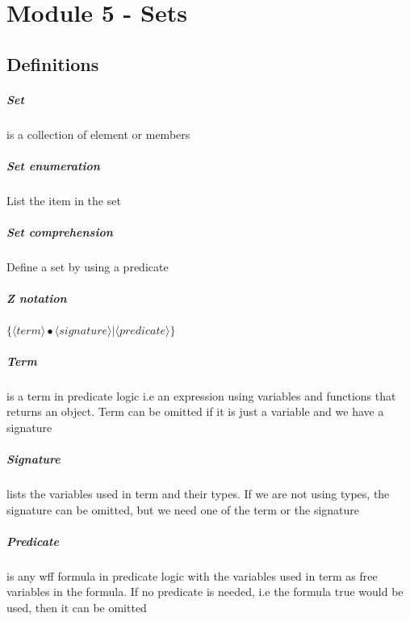\chapter{Module 5 - Sets}
  \section{Definitions}
    \paragraph{Set} is a collection of element or members

    \paragraph{Set enumeration} List the item in the set

    \paragraph{Set comprehension} Define a set by using a predicate

    \paragraph{Z notation} $ \{ \langle term \rangle \bullet \langle signature
    \rangle | \langle predicate \rangle \} $

    \paragraph{Term} is a term in predicate logic i.e an expression using
    variables and functions that returns an object. Term can be omitted if it
    is just a variable and we have a signature

    \paragraph{Signature} lists the variables used in term and their types. If
    we are not using types, the signature can be omitted, but we need one of
    the term or the signature

    \paragraph{Predicate} is any wff formula in predicate logic with the
    variables used in term as free variables in the formula. If no predicate is
    needed, i.e the formula true would be used, then it can be omitted

